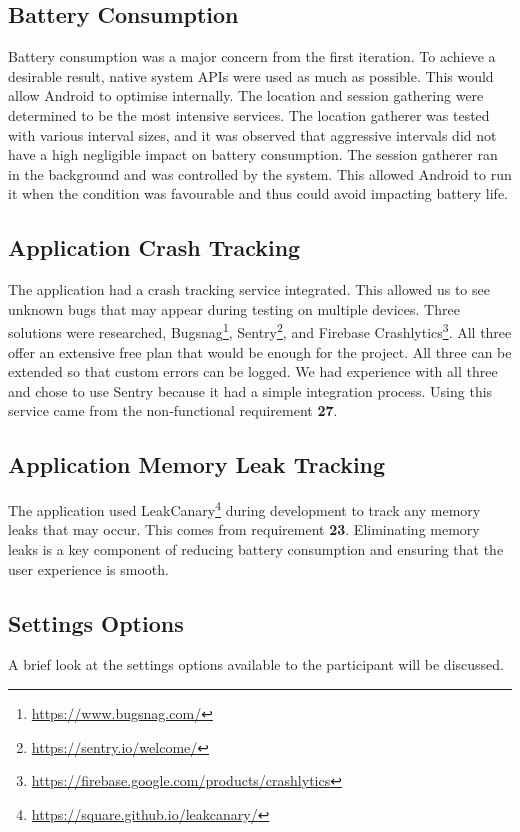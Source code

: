\documentclass{l4proj}
\begin{document}
\subsection{Battery Consumption}
Battery consumption was a major concern from the first iteration. To achieve a desirable result, native system APIs were used as much as possible. This would allow Android to optimise internally. The location and session gathering were determined to be the most intensive services. The location gatherer was tested with various interval sizes, and it was observed that aggressive intervals did not have a high negligible impact on battery consumption. The session gatherer ran in the background and was controlled by the system. This allowed Android to run it when the condition was favourable and thus could avoid impacting battery life.

\subsection{Application Crash Tracking}
The application had a crash tracking service integrated. This allowed us to see unknown bugs that may appear during testing on multiple devices. Three solutions were researched, Bugsnag\footnote{\url{https://www.bugsnag.com/}}, Sentry\footnote{\url{https://sentry.io/welcome/}}, and Firebase Crashlytics\footnote{\url{https://firebase.google.com/products/crashlytics}}. All three offer an extensive free plan that would be enough for the project. All three can be extended so that custom errors can be logged. We had experience with all three and chose to use Sentry because it had a simple integration process. Using this service came from the non-functional requirement \textbf{27}.

\subsection{Application Memory Leak Tracking}
The application used LeakCanary\footnote{\url{https://square.github.io/leakcanary/}} during development to track any memory leaks that may occur. This comes from requirement \textbf{23}. Eliminating memory leaks is a key component of reducing battery consumption and ensuring that the user experience is smooth.

\subsection{Settings Options}
A brief look at the settings options available to the participant will be discussed.
\end{document}

